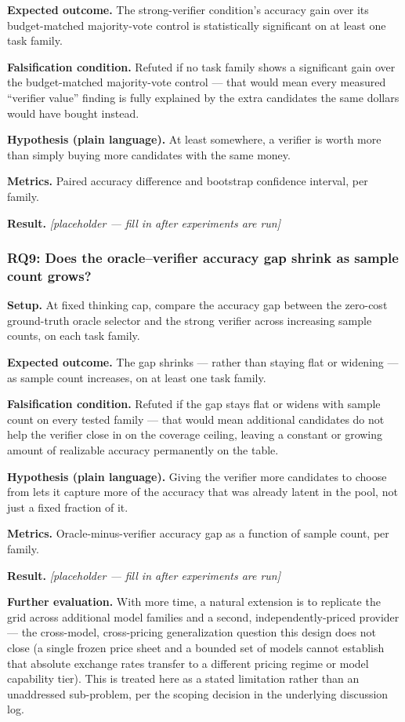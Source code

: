 \documentclass[11pt]{article}
\newcommand{\ph}{\textit{[placeholder --- fill in after experiments are run]}}
\begin{document}
\textbf{Expected outcome.} The strong-verifier condition's accuracy gain over its budget-matched majority-vote control is statistically significant on at least one task family.

\textbf{Falsification condition.} Refuted if no task family shows a significant gain over the budget-matched majority-vote control --- that would mean every measured ``verifier value'' finding is fully explained by the extra candidates the same dollars would have bought instead.

\textbf{Hypothesis (plain language).} At least somewhere, a verifier is worth more than simply buying more candidates with the same money.

\textbf{Metrics.} Paired accuracy difference and bootstrap confidence interval, per family.

\textbf{Result.} \ph

\subsubsection{RQ9: Does the oracle--verifier accuracy gap shrink as sample count grows?}
\textbf{Setup.} At fixed thinking cap, compare the accuracy gap between the zero-cost ground-truth oracle selector and the strong verifier across increasing sample counts, on each task family.

\textbf{Expected outcome.} The gap shrinks --- rather than staying flat or widening --- as sample count increases, on at least one task family.

\textbf{Falsification condition.} Refuted if the gap stays flat or widens with sample count on every tested family --- that would mean additional candidates do not help the verifier close in on the coverage ceiling, leaving a constant or growing amount of realizable accuracy permanently on the table.

\textbf{Hypothesis (plain language).} Giving the verifier more candidates to choose from lets it capture more of the accuracy that was already latent in the pool, not just a fixed fraction of it.

\textbf{Metrics.} Oracle-minus-verifier accuracy gap as a function of sample count, per family.

\textbf{Result.} \ph

\vspace{0.5em}
\noindent\textbf{Further evaluation.} With more time, a natural extension is to replicate the grid across additional model families and a second, independently-priced provider --- the cross-model, cross-pricing generalization question this design does not close (a single frozen price sheet and a bounded set of models cannot establish that absolute exchange rates transfer to a different pricing regime or model capability tier). This is treated here as a stated limitation rather than an unaddressed sub-problem, per the scoping decision in the underlying discussion log.
\end{document}
